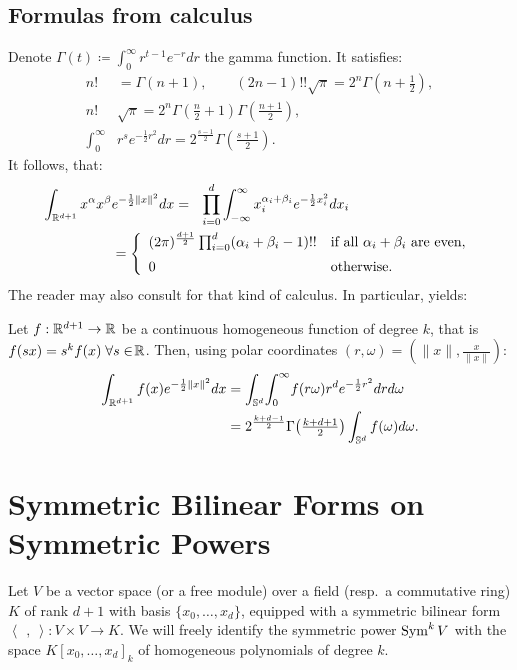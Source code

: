 \subsection{Formulas from calculus}
Denote $\Gamma(t) \coloneqq \int_{0}^{\infty}r^{t-1}e^{-r}dr$ the gamma function. It satisfies:
\begin{align}
\label{ffgamma}
n!&=\Gamma(n+1),\qquad (2n-1)!!\sqrt{\pi} =2^{n}\Gamma\left(n+\tfrac{1}{2}\right), \\
\label{doublegamma}
n!&\sqrt{\pi}=2^{n}\Gamma\left(\tfrac{n}{2}+1\right)\Gamma\left(\tfrac{n+1}{2}\right) ,\\
\int_0^\infty& r^se^{-\frac{1}{2}r^2} dr = 2^{\frac{s-1}{2}}\Gamma\left(\tfrac{s+1}{2}\right).
\end{align}
It follows, that:
\begin{align}    \label{monoint}
 \int_{\R^{d+1}}x^\alpha x^\beta & e^{-\frac{1}{2}\|x\|^2} dx = \ \ 
\displaystyle \prod_{i=0}^d \int_{-\infty}^\infty x_i^{\alpha_i+\beta_i} e^{-\frac{1}{2}x_i^2} dx_i \\
 &= \left\{
\begin{array}{*2{l}p{5cm}}
(2 \pi)^{\frac{d+1}{2}}\prod_{i=0}^d (\alpha_i+\beta_i-1)!! &\text{if all }\alpha_i+\beta_i\text{ are even}, \vspace{0.2cm} \\ 
 0 &\text{otherwise}.
\end{array}
  \right.\nonumber
\end{align}
The reader may also consult \cite{Folland} for that kind of calculus. In particular, \cite[Eq.~(4)]{Folland} yields:
\begin{lemma}\label{homosphere}
Let $f:\mathbb{R}^{d+1}\rightarrow\mathbb{R}$ be a continuous homogeneous function of degree $k$, that is $f(sx) = s^kf(x)\; \forall s\in\!\mathbb{R}$. Then, using polar coordinates $(r,\omega) = (\|x\|,\frac{x}{\|x\|})$:
\begin{align*}
\int_{\mathbb{R}^{d+1}}f(x)e^{-\frac{1}{2}\|x\|^2} dx &= \int_{\mathbb{S}^d}\!\int_0^\infty\! f(r\omega) r^d e^{-\frac{1}{2}r^2}dr d\omega \\
&= 2^{\frac{k+d-1}{2}}\Gamma\!\left(\tfrac{k+d+1}{2}\right)\int_{\mathbb{S}^d}f(\omega)d\omega .
\end{align*}
\end{lemma}

\section{Symmetric Bilinear Forms on Symmetric Powers} \label{symSection}
Let $V$ be a vector space (or a free module) over a field (resp.~a commutative ring) $K$ of rank $d+1$ with basis $\{x_0,\ldots,x_{d}\}$, equipped with a symmetric bilinear form $\left<\,\ ,\ \right>: V\times V \rightarrow K$. We will freely identify the symmetric power $\operatorname{Sym}^kV$ with the space $K[x_0,\ldots,x_d]_k$ of homogeneous polynomials of degree $k$. 

